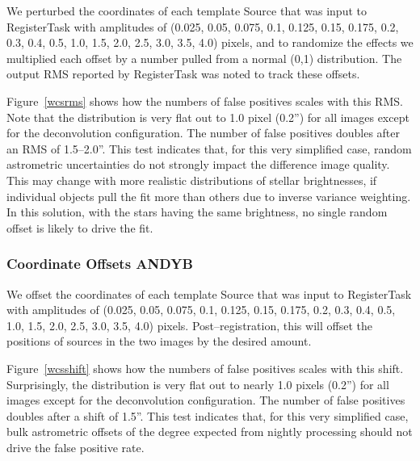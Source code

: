 \documentclass[prd, nofootinbib, floatfix, 11pt,tightenlines,times]{article}
\begin{document}
We perturbed the coordinates of each template Source that was input to
RegisterTask with amplitudes of (0.025, 0.05, 0.075, 0.1, 0.125, 0.15,
0.175, 0.2, 0.3, 0.4, 0.5, 1.0, 1.5, 2.0, 2.5, 3.0, 3.5, 4.0) pixels,
and to randomize the effects we multiplied each offset by a number
pulled from a normal (0,1) distribution.  The output RMS reported by
RegisterTask was noted to track these offsets.  

Figure~\ref{wcsrms} shows how the numbers of false positives scales
with this RMS.  Note that the distribution is very flat out to 1.0
pixel (0.2'') for all images except for the deconvolution
configuration.  The number of false positives doubles after an RMS of
1.5--2.0''.  This test indicates that, for this very simplified case,
random astrometric uncertainties do not strongly impact the difference
image quality.  This may change with more realistic distributions of
stellar brightnesses, if individual objects pull the fit more than
others due to inverse variance weighting.  In this solution, with the
stars having the same brightness, no single random offset is likely to
drive the fit.

\subsubsection{Coordinate Offsets {\bf ANDYB}}

We offset the coordinates of each template Source that was input to
RegisterTask with amplitudes of (0.025, 0.05, 0.075, 0.1, 0.125, 0.15,
0.175, 0.2, 0.3, 0.4, 0.5, 1.0, 1.5, 2.0, 2.5, 3.0, 3.5, 4.0) pixels.
Post--registration, this will offset the positions of sources in the
two images by the desired amount.

Figure~\ref{wcsshift} shows how the numbers of false positives scales
with this shift.  Surprisingly, the distribution is very flat out to
nearly 1.0 pixels (0.2'') for all images except for the deconvolution
configuration.  The number of false positives doubles after a shift of
1.5''.  This test indicates that, for this very simplified case, bulk
astrometric offsets of the degree expected from nightly processing
should not drive the false positive rate.  
\end{document}
